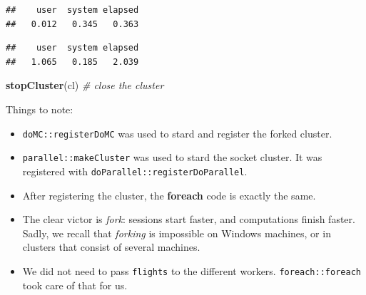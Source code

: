 \documentclass[]{book}
\newenvironment{Shaded}{\begin{snugshade}}{\end{snugshade}}
\newcommand{\CommentTok}[1]{\textcolor[rgb]{0.56,0.35,0.01}{\textit{#1}}}
\newcommand{\DataTypeTok}[1]{\textcolor[rgb]{0.13,0.29,0.53}{#1}}
\newcommand{\DecValTok}[1]{\textcolor[rgb]{0.00,0.00,0.81}{#1}}
\newcommand{\KeywordTok}[1]{\textcolor[rgb]{0.13,0.29,0.53}{\textbf{#1}}}
\newcommand{\NormalTok}[1]{#1}
\newcommand{\OperatorTok}[1]{\textcolor[rgb]{0.81,0.36,0.00}{\textbf{#1}}}
\newcommand{\StringTok}[1]{\textcolor[rgb]{0.31,0.60,0.02}{#1}}
\providecommand{\tightlist}{%
  \setlength{\itemsep}{0pt}\setlength{\parskip}{0pt}}
\theoremstyle{definition}
\theoremstyle{definition}
\theoremstyle{definition}
\theoremstyle{remark}
\begin{document}
\begin{verbatim}
##    user  system elapsed 
##   0.012   0.345   0.363
\end{verbatim}

\begin{Shaded}
\end{Shaded}

\begin{verbatim}
##    user  system elapsed 
##   1.065   0.185   2.039
\end{verbatim}

\begin{Shaded}
\begin{Highlighting}[]
\KeywordTok{stopCluster}\NormalTok{(cl) }\CommentTok{# close the cluster}
\end{Highlighting}
\end{Shaded}

Things to note:

\begin{itemize}
\tightlist
\item
  \texttt{doMC::registerDoMC} was used to stard and register the forked cluster.
\item
  \texttt{parallel::makeCluster} was used to stard the socket cluster. It was registered with \texttt{doParallel::registerDoParallel}.
\item
  After registering the cluster, the \textbf{foreach} code is exactly the same.
\item
  The clear victor is \emph{fork}: sessions start faster, and computations finish faster. Sadly, we recall that \emph{forking} is impossible on Windows machines, or in clusters that consist of several machines.
\item
  We did not need to pass \texttt{flights} to the different workers. \texttt{foreach::foreach} took care of that for us.
\end{itemize}
\end{document}
